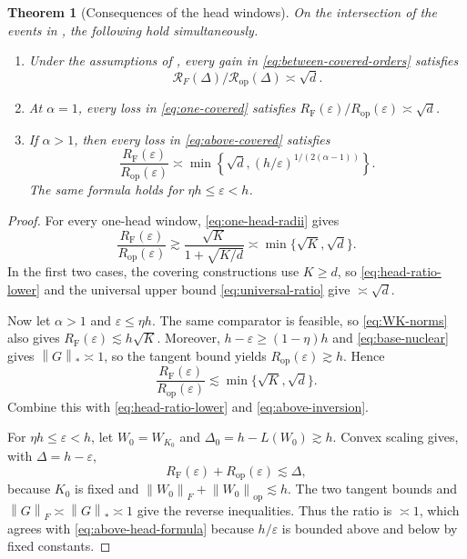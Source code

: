 \documentclass[11pt]{article}
\newtheorem{theorem}{Theorem}[section]
\theoremstyle{definition}
\newcommand{\normF}[1]{\left\lVert #1\right\rVert_F}
\newcommand{\normop}[1]{\left\lVert #1\right\rVert_{\mathrm{op}}}
\newcommand{\normnuc}[1]{\left\lVert #1\right\rVert_*}
\newcommand{\RF}{R_{\mathrm F}}
\newcommand{\Rop}{R_{\mathrm{op}}}
\newcommand{\eps}{\varepsilon}
\begin{document}
\begin{theorem}[Consequences of the head windows]
\label{thm:head-results}
On the intersection of the events in
, the following
hold simultaneously.
\begin{enumerate}[label=\textup{(\roman*)}]
\item Under the assumptions of , every gain
in \eqref{eq:between-covered-orders} satisfies
\[
 \mathcal R_F(\Delta)/\mathcal R_{\mathrm{op}}(\Delta)\asymp\sqrt d.
\]
\item At $\alpha=1$, every loss in \eqref{eq:one-covered} satisfies
$\RF(\eps)/\Rop(\eps)\asymp\sqrt d$.
\item If $\alpha>1$, then every loss in
\eqref{eq:above-covered} satisfies
\begin{equation}
 \frac{\RF(\eps)}{\Rop(\eps)}
 \asymp
 \min\left\{\sqrt d,
 (h/\eps)^{1/(2(\alpha-1))}\right\}.
 \label{eq:above-head-formula}
\end{equation}
The same formula holds for $\eta h\leq\eps<h$.
\end{enumerate}
\end{theorem}

\begin{proof}
For every one-head window, \eqref{eq:one-head-radii} gives
\begin{equation}
 \frac{\RF(\eps)}{\Rop(\eps)}
 \gtrsim\frac{\sqrt K}{1+\sqrt{K/d}}
 \asymp\min\{\sqrt K,\sqrt d\}.
 \label{eq:head-ratio-lower}
\end{equation}
In the first two cases, the covering constructions use $K\geq d$, so
\eqref{eq:head-ratio-lower} and the universal upper bound
\eqref{eq:universal-ratio} give $\asymp\sqrt d$.

Now let $\alpha>1$ and $\eps\leq\eta h$.  The same comparator is
feasible, so \eqref{eq:WK-norms} also gives
$\RF(\eps)\lesssim h\sqrt K$.  Moreover,
$h-\eps\geq(1-\eta)h$ and \eqref{eq:base-nuclear} gives
$\normnuc{G}\asymp1$, so the tangent bound yields
$\Rop(\eps)\gtrsim h$.  Hence
\[
 \frac{\RF(\eps)}{\Rop(\eps)}
 \lesssim\min\{\sqrt K,\sqrt d\}.
\]
Combine this with \eqref{eq:head-ratio-lower} and
\eqref{eq:above-inversion}.

For $\eta h\leq\eps<h$, let $W_0=W_{K_0}$ and
$\Delta_0=h-L(W_0)\gtrsim h$.  Convex scaling gives, with
$\Delta=h-\eps$,
\[
 \RF(\eps)+\Rop(\eps)\lesssim\Delta,
\]
because $K_0$ is fixed and $\normF{W_0}+\normop{W_0}\lesssim h$.
The two tangent bounds and
$\normF{G}\asymp\normnuc{G}\asymp1$ give the reverse inequalities.
Thus the ratio is $\asymp1$, which agrees with
\eqref{eq:above-head-formula} because $h/\eps$ is bounded above and
below by fixed constants.
\end{proof}
\end{document}
